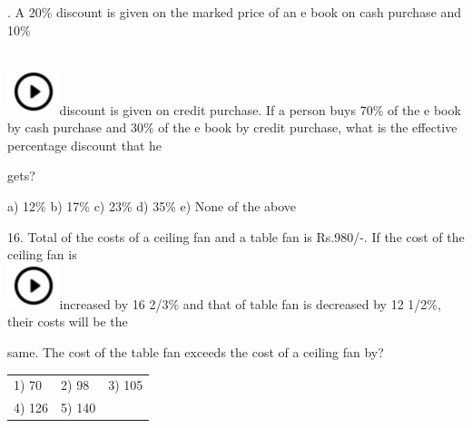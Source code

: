 \documentclass{article}
\begin{document}
	\noindent 
	
	\noindent 
	
	. A 20\% discount is given on the marked price of an e book on cash purchase and 10\%
	
	\noindent 
	
	\noindent \noindent \\ \includegraphics*[width=0.60in, height=0.52in]{images/image1}discount is given on credit purchase. If a person buys 70\% of the e book by cash purchase and 30\% of the e book by credit purchase, what is the effective percentage discount that he
	
	\noindent 
	
	\noindent gets?
	
	\noindent 
	
	\noindent a) 12\%                    b) 17\%              c) 23\%              d) 35\%              e) None of the above
	
	\noindent 
	
	\noindent 
	
	16. Total of the costs of a ceiling fan and a table fan is Rs.980/-. If the cost of the ceiling fan is \noindent \\ \includegraphics*[width=0.60in, height=0.52in]{images/image1}increased by 16 2/3\% and that of table fan is decreased by 12 1/2\%, their costs will be the
	
	\noindent same. The cost of the table fan exceeds the cost of a ceiling fan by?
	
	\noindent 
	
	\noindent  
	\begin{tabular}{p{1.7in} p{1.6in} p{1.6in}} \\ 
 1) 70                        & 2) 98                 & 3) 105                   \\
4) 126           & 5) 140 \\
\end{tabular}
	
	\noindent 
	
	\noindent 
	
	\noindent 
	
\end{document}
